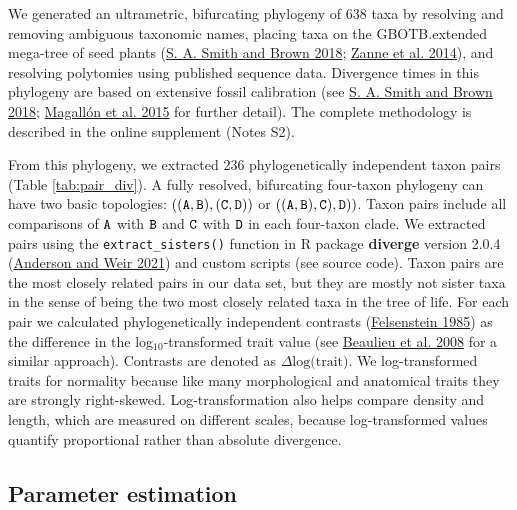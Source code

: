\documentclass[
  12pt,
]{article}
\begin{document}
We generated an ultrametric, bifurcating phylogeny of 638 taxa by resolving and removing ambiguous taxonomic names, placing taxa on the GBOTB.extended mega-tree of seed plants (\protect\hyperlink{ref-smith_constructing_2018}{S. A. Smith and Brown 2018}; \protect\hyperlink{ref-zanne_three_2014}{Zanne et al. 2014}), and resolving polytomies using published sequence data. Divergence times in this phylogeny are based on extensive fossil calibration (see \protect\hyperlink{ref-smith_constructing_2018}{S. A. Smith and Brown 2018}; \protect\hyperlink{ref-magallon_metacalibrated_2015}{Magallón et al. 2015} for further detail). The complete methodology is described in the online supplement (Notes S2).

From this phylogeny, we extracted 236 phylogenetically independent taxon pairs (Table \ref{tab:pair_div}). A fully resolved, bifurcating four-taxon phylogeny can have two basic topologies: \(\tt{((A,B),(C,D))}\) or \(\tt{((A,B),C),D))}\). Taxon pairs include all comparisons of \(\tt{A}\) with \(\tt{B}\) and \(\tt{C}\) with \(\tt{D}\) in each four-taxon clade. We extracted pairs using the \texttt{extract\_sisters()} function in R package \textbf{diverge} version 2.0.4 (\protect\hyperlink{ref-anderson_diverge_2021}{Anderson and Weir 2021}) and custom scripts (see source code). Taxon pairs are the most closely related pairs in our data set, but they are mostly not sister taxa in the sense of being the two most closely related taxa in the tree of life. For each pair we calculated phylogenetically independent contrasts (\protect\hyperlink{ref-felsenstein_phylogenies_1985}{Felsenstein 1985}) as the difference in the log\(_{10}\)-transformed trait value (see \protect\hyperlink{ref-beaulieu_genome_2008}{Beaulieu et al. 2008} for a similar approach). Contrasts are denoted as \(\Delta \text{log(trait)}\). We log-transformed traits for normality because like many morphological and anatomical traits they are strongly right-skewed. Log-transformation also helps compare density and length, which are measured on different scales, because log-transformed values quantify proportional rather than absolute divergence.

\hypertarget{parameter-estimation}{%
\subsection{Parameter estimation}\label{parameter-estimation}}
\end{document}
